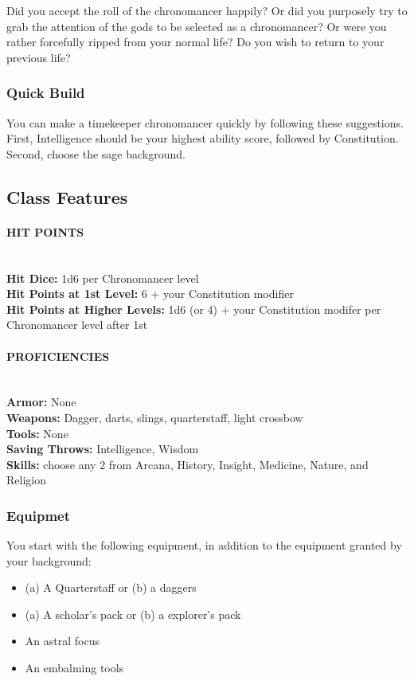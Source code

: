 Did you accept the roll of the chronomancer happily? Or did you purposely try to grab the attention of the gods to be selected as a chronomancer? Or were you rather forcefully ripped from your normal life? Do you wish to return to your previous life?

\subsubsection{Quick Build}

You can make a timekeeper chronomancer quickly by following these suggestions. First, Intelligence should be your highest ability score, followed by Constitution. Second, choose the sage background.

\subsection{Class Features}

\paragraph{HIT POINTS}\mbox{}\\
\textbf{Hit Dice:} 1d6 per Chronomancer level\\
\textbf{Hit Points at 1st Level:} 6 + your Constitution modifier\\
\textbf{Hit Points at Higher Levels:} 1d6 (or 4) + your  Constitution modifer per Chronomancer level after 1st

\paragraph{PROFICIENCIES}\mbox{}\\
\textbf{Armor:} None\\
\textbf{Weapons:} Dagger, darts, slings, quarterstaff, light crossbow\\
\textbf{Tools:} None\\
\textbf{Saving Throws:} Intelligence, Wisdom\\
\textbf{Skills:} choose any 2 from Arcana, History, Insight, Medicine, Nature, and Religion

\subsubsection{Equipmet}
You start with the following equipment, in addition to the equipment granted by your background:
\begin{itemize}
\item (a) A Quarterstaff or (b) a daggers
\item (a) A scholar's pack or (b) a explorer's pack
\item An astral focus 
\item An embalming tools
\end{itemize}

